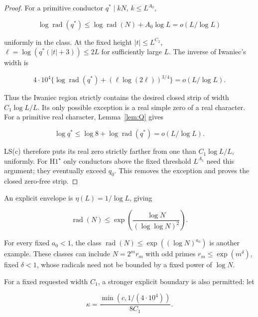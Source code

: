 \documentclass[11pt]{article}
\theoremstyle{definition}
\theoremstyle{remark}
\numberwithin{equation}{section}
\begin{document}
\begin{proof} For a primitive conductor $q^*\mid kN$, $k\le L^{A_0}$,


\begin{equation}
\log\operatorname{rad}(q^*)\le\log\operatorname{rad}(N)+A_0\log L
=o(L/\log L)
\end{equation}


uniformly in the class. At the fixed height $|t|\le L^{C_2}$,
$\ell=\log(q^*(|t|+3))\le2L$ for sufficiently large $L$. The inverse of Iwaniec's width is


\begin{equation}
4\cdot10^4\{\log\operatorname{rad}(q^*)+(\ell\log(2\ell))^{3/4}\}
=o(L/\log L).
\end{equation}


Thus the Iwaniec region strictly contains the desired closed strip of width $C_1\log L/L$. Its only possible exception is a real simple zero of a real character. For a primitive real character, Lemma~\ref{lem:Q} gives


\begin{equation}
\log q^*\le\log8+\log\operatorname{rad}(q^*)=o(L/\log L).
\end{equation}


LS(c) therefore puts its real zero strictly farther from one than $C_1\log L/L$, uniformly. For $\mathrm H1^\star$ only conductors above the fixed threshold $L^{A_1}$ need this argument; they eventually exceed $q_0$. This removes the exception and proves the closed zero-free strip. \end{proof}

An explicit envelope is $\eta(L)=1/\log L$, giving


\begin{equation}\label{v2:12-2}
\operatorname{rad}(N)\le\exp\left(\frac{\log N}{(\log\log N)^2}\right).
\end{equation}


For every fixed $a_0<1$, the class $\operatorname{rad}(N)\le\exp((\log N)^{a_0})$ is another example. These classes can include $N=2^m r_m$ with odd primes $r_m\le\exp(m^\delta)$, fixed $\delta<1$, whose radicals need not be bounded by a fixed power of $\log N$.

For a fixed requested width $C_1$, a stronger explicit boundary is also permitted: let


\begin{equation}
\kappa=\frac{\min(c,1/(4\cdot10^4))}{8C_1}.
\end{equation}
\end{document}
